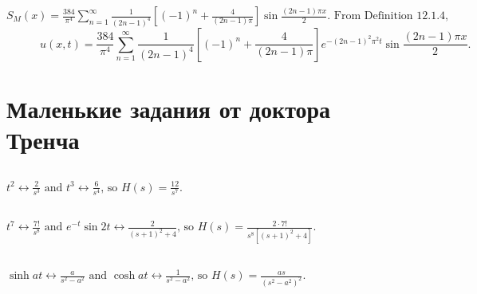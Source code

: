\documentclass{article}
\begin{document}
	$\displaystyle S_{M}(x)=\frac{384}{\pi^{4}}\sum\limits_{n=1}^{\infty}\frac{1}{(2n-1)^{4}}\left[(-1)^{n}+\frac{4}{(2n-1)\pi}\right]\sin{\frac{(2n-1)\pi x}{2}}. \text{ From Definition 12.1.4},$
	$$\quad \quad \quad u(x,t)=\frac{384}{\pi^{4}}\sum\limits_{n=1}^{\infty}\frac{1}{(2n-1)^{4}}\left[(-1)^{n}+\frac{4}{(2n-1)\pi}\right]e^{-(2n-1)^{2}\pi^{2}t}\sin{\frac{(2n-1)\pi x}{2}}.$$

	\section{Маленькие задания от доктора Тренча}
	\subsection{}
	$\displaystyle t^{2} \leftrightarrow \frac{2}{s^{3}} \text{ and } t^{3} \leftrightarrow \frac{6}{s^{4}} \text{, so } H(s)=\frac{12}{s^{7}}$.
	\subsection{}
	$\displaystyle t^{7} \leftrightarrow \frac{7!}{s^{8}} \text{ and } e^{-t}\sin{2t} \leftrightarrow \frac{2}{(s+1)^{2}+4} \text{, so } H(s)=\frac{2\cdot7!}{s^{8}[(s+1)^{2}+4]}$.
	\subsection{}
	$\displaystyle \sinh{at} \leftrightarrow \frac{a}{s^{2}-a^{2}} \text{ and } \cosh{at} \leftrightarrow \frac{1}{s^{2}-a^{2}} \text{, so } H(s)=\frac{as}{(s^{2}-a^{2})^{2}}$.
\end{document}
